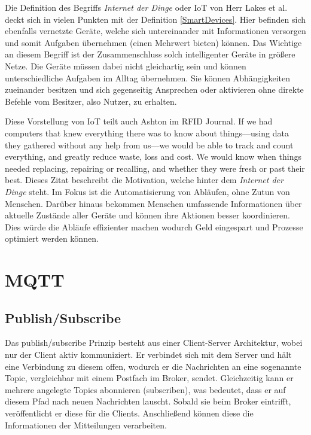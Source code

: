     Die Definition des Begriffs \emph{Internet der Dinge} oder \ac{IoT} von Herr Lakes et al. deckt sich in vielen Punkten mit der Definition \ref{SmartDevices}. Hier befinden sich ebenfalls vernetzte Geräte, welche sich untereinander mit Informationen versorgen und somit Aufgaben übernehmen (einen Mehrwert bieten) können. Das Wichtige an diesem Begriff ist der Zusammenschluss solch intelligenter Geräte in größere Netze. Die Geräte müssen dabei nicht gleichartig sein und können unterschiedliche Aufgaben im Alltag übernehmen. Sie können Abhängigkeiten zueinander besitzen und sich gegenseitig Ansprechen oder aktivieren ohne direkte Befehle vom Besitzer, also Nutzer, zu erhalten.
    
    Diese Vorstellung von \ac{IoT} teilt auch Ashton im RFID Journal.
    \grqq If we had computers that knew everything there was to know about things—using data they gathered without any help from us—we would be able to track and count everything, and greatly reduce waste, loss and cost. We would know when things needed replacing, repairing or recalling, and whether they were fresh or past their best.\glqq{} \cite{ashton2009internet}
    Dieses Zitat beschreibt die Motivation, welche hinter dem \emph{Internet der Dinge} steht.
    Im Fokus ist die Automatisierung von Abläufen, ohne Zutun von Menschen. Darüber hinaus bekommen Menschen umfassende Informationen über aktuelle Zustände aller Geräte und können ihre Aktionen besser koordinieren. Dies würde die Abläufe effizienter machen wodurch Geld eingespart und Prozesse optimiert werden können.

\section{MQTT}
    \subsection{Publish/Subscribe}
    Das publish/subscribe Prinzip besteht aus einer Client-Server Architektur, wobei nur der Client aktiv kommuniziert. Er verbindet sich mit dem Server und hält eine Verbindung zu diesem offen, wodurch er die Nachrichten an eine sogenannte Topic, vergleichbar mit einem Postfach im Broker, sendet. Gleichzeitig kann er mehrere angelegte Topics abonnieren (subscriben), was bedeutet, dass er auf diesem Pfad nach neuen Nachrichten lauscht. Sobald sie beim Broker eintrifft, veröffentlicht er diese für die Clients. Anschließend können diese die Informationen der Mitteilungen verarbeiten.

